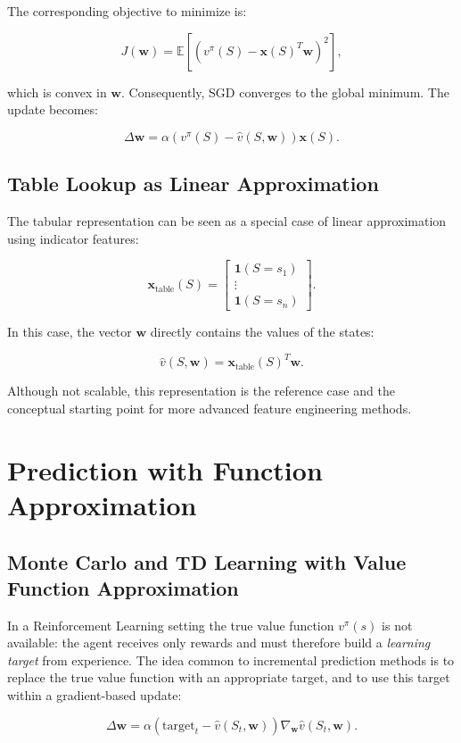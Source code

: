 The corresponding objective to minimize is:

\[
J(\mathbf{w})
=
\mathbb{E}
\left[
\left( v^\pi(S) - \mathbf{x}(S)^T \mathbf{w} \right)^2
\right],
\]

which is convex in $\mathbf{w}$.
Consequently, SGD converges to the global minimum.
The update becomes:

\[
\Delta \mathbf{w}
=
\alpha
\left( v^\pi(S) - \hat{v}(S,\mathbf{w}) \right)
\mathbf{x}(S).
\]

\subsection{Table Lookup as Linear Approximation}

The tabular representation can be seen as a special case of linear approximation using indicator features:

\[
\mathbf{x}_{\text{table}}(S)
=
\begin{bmatrix}
\mathbf{1}(S = s_1) \\
\vdots \\
\mathbf{1}(S = s_n)
\end{bmatrix}.
\]

In this case, the vector $\mathbf{w}$ directly contains the values of the states:

\[
\hat{v}(S,\mathbf{w})
=
\mathbf{x}_{\text{table}}(S)^T \mathbf{w}.
\]

Although not scalable, this representation is the reference case and the conceptual starting point for more advanced feature engineering methods.
\section{Prediction with Function Approximation}

\subsection{Monte Carlo and TD Learning with Value Function Approximation}

In a Reinforcement Learning setting the true value function $v^\pi(s)$ is not available:
the agent receives only rewards and must therefore build a \textit{learning target} from experience.
The idea common to incremental prediction methods is to replace the true value function with an appropriate target, and to use this target within a gradient-based update:

\[
\Delta \mathbf{w}
=
\alpha \left( \text{target}_t - \hat{v}(S_t,\mathbf{w}) \right)
\nabla_{\mathbf{w}} \hat{v}(S_t,\mathbf{w}).
\]

